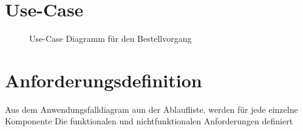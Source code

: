 \section{Use-Case}
\begin{figure}[!ht]
\caption{Use-Case Diagramm für den Bestellvorgang}
\label{fig:use-case}
\end{figure}

\section{Anforderungsdefinition}
Aus dem Anwendungsfalldiagram aun der Ablaufliste, werden für jede einzelne Komponente Die funktionalen und nichtfunktionalen Anforderungen definiert

